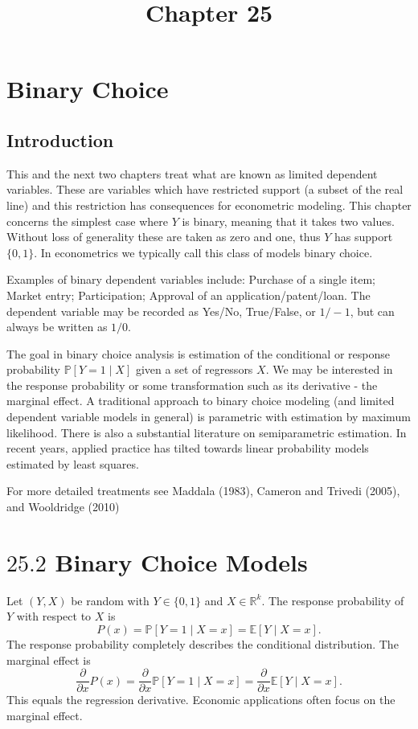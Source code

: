 \documentclass[10pt]{article}
\title{Chapter 25 }
\author{}
\date{}
\begin{document}
\maketitle
\section{Binary Choice}
\subsection{Introduction}
This and the next two chapters treat what are known as limited dependent variables. These are variables which have restricted support (a subset of the real line) and this restriction has consequences for econometric modeling. This chapter concerns the simplest case where $Y$ is binary, meaning that it takes two values. Without loss of generality these are taken as zero and one, thus $Y$ has support $\{0,1\}$. In econometrics we typically call this class of models binary choice.

Examples of binary dependent variables include: Purchase of a single item; Market entry; Participation; Approval of an application/patent/loan. The dependent variable may be recorded as Yes/No, True/False, or $1 /-1$, but can always be written as $1 / 0$.

The goal in binary choice analysis is estimation of the conditional or response probability $\mathbb{P}[Y=1 \mid X]$ given a set of regressors $X$. We may be interested in the response probability or some transformation such as its derivative - the marginal effect. A traditional approach to binary choice modeling (and limited dependent variable models in general) is parametric with estimation by maximum likelihood. There is also a substantial literature on semiparametric estimation. In recent years, applied practice has tilted towards linear probability models estimated by least squares.

For more detailed treatments see Maddala (1983), Cameron and Trivedi (2005), and Wooldridge (2010)

\section{$25.2$ Binary Choice Models}
Let $(Y, X)$ be random with $Y \in\{0,1\}$ and $X \in \mathbb{R}^{k}$. The response probability of $Y$ with respect to $X$ is
$$
P(x)=\mathbb{P}[Y=1 \mid X=x]=\mathbb{E}[Y \mid X=x] .
$$
The response probability completely describes the conditional distribution. The marginal effect is
$$
\frac{\partial}{\partial x} P(x)=\frac{\partial}{\partial x} \mathbb{P}[Y=1 \mid X=x]=\frac{\partial}{\partial x} \mathbb{E}[Y \mid X=x] .
$$
This equals the regression derivative. Economic applications often focus on the marginal effect.
\end{document}
